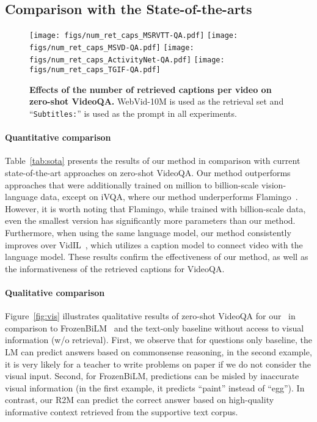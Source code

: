 \subsection{Comparison with the State-of-the-arts}
\label{subsec:sota}


\begin{figure*}[t!]
    \centering
    \texttt{[image: figs/num\_ret\_caps\_MSRVTT-QA.pdf]}
    \texttt{[image: figs/num\_ret\_caps\_MSVD-QA.pdf]}
    \texttt{[image: figs/num\_ret\_caps\_ActivityNet-QA.pdf]}
    \texttt{[image: figs/num\_ret\_caps\_TGIF-QA.pdf]}
    \vspace{-2mm}
    \caption{{\bf Effects of the number of retrieved captions per video on zero-shot VideoQA.} WebVid-10M is used as the retrieval set and ``{\tt Subtitles:}'' is used as the prompt in all experiments. }
    \vspace{-3mm}
    \label{fig:num_retrieve}
\end{figure*} 
\paragraph{Quantitative comparison} Table~\ref{tab:sota} presents the results of our method in comparison with current state-of-the-art approaches on zero-shot VideoQA. Our method outperforms approaches that were additionally trained on million to billion-scale vision-language data, except on iVQA, where our method underperforms Flamingo~\cite{flamingo}. However, it is worth noting that Flamingo, while trained with billion-scale data, even the smallest version has significantly more parameters than our method.
Furthermore, when using the same language model, our method consistently improves over VidIL~\cite{vidil}, which utilizes a caption model to connect video with the language model. These results confirm the effectiveness of our method, as well as the informativeness of the retrieved captions for VideoQA.

\vspace{-3.5mm}


\paragraph{Qualitative comparison} Figure~\ref{fig:vis} illustrates qualitative results of zero-shot VideoQA for our \modelname~in comparison to FrozenBiLM~\cite{frozenbilm} and the text-only baseline without access to visual information (w/o retrieval). First, we observe that for questions only baseline, the LM can predict answers based on commonsense reasoning, \eg in the second example, it is very likely for a teacher to write problems on paper if we do not consider the visual input.  Second, for FrozenBiLM, predictions can be misled by inaccurate visual information (\eg in the first example, it predicts ``paint'' instead of ``egg''). In contrast, our R2M can predict the correct answer based on high-quality informative context retrieved from the supportive text corpus.

